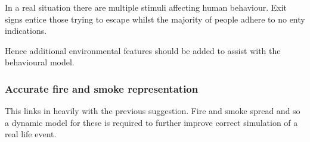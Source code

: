 In a real situation there are multiple stimuli affecting human behaviour.
Exit signs entice those trying to escape whilst the majority of people
adhere to no enty indications.

Hence additional environmental features should be added to assist
with the behavioural model.


\subsubsection*{Accurate fire and smoke representation}

This links in heavily with the previous suggestion. Fire and smoke
spread and so a dynamic model for these is required to further improve
correct simulation of a real life event.

